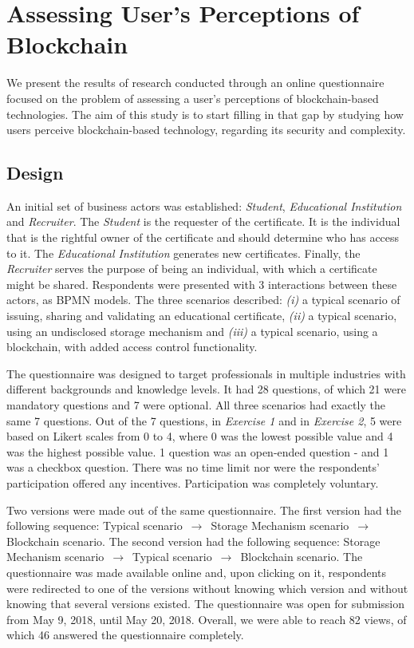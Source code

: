 \section{Assessing User's Perceptions of Blockchain}

We present the results of research conducted through an online questionnaire focused on the problem of assessing a user's perceptions of blockchain-based technologies. The aim of this study is to start filling in that gap by studying how users perceive blockchain-based technology, regarding its security and complexity.

\subsection{Design}

An initial set of business actors was established: \textit{Student}, \textit{Educational Institution} and \textit{Recruiter}. The \textit{Student} is the requester of the certificate. It is the individual that is the rightful owner of the certificate and should determine who has access to it. The \textit{Educational Institution} generates new certificates. Finally, the \textit{Recruiter} serves the purpose of being an individual, with which a certificate might be shared. Respondents were presented with 3 interactions between these actors, as BPMN \cite{BPMN} models. The three scenarios described: \emph{(i)} a typical scenario of issuing, sharing and validating an educational certificate, \emph{(ii)} a typical scenario, using an undisclosed storage mechanism and \emph{(iii)} a typical scenario, using a blockchain, with added access control functionality.

The questionnaire was designed to target professionals in multiple industries with different backgrounds and knowledge levels. It had 28 questions, of which 21 were mandatory questions and 7 were optional. All three scenarios had exactly the same 7 questions. Out of the 7 questions, in \textit{Exercise 1} and in \textit{Exercise 2}, 5 were based on Likert scales from 0 to 4, where 0 was the lowest possible value and 4 was the highest possible value. 1 question was an open-ended question - and 1 was a checkbox question. There was no time limit nor were the respondents' participation offered any incentives. Participation was completely voluntary. 

Two versions were made out of the same questionnaire. The first version had the following sequence: Typical scenario $\,\to\,$ Storage Mechanism scenario $\,\to\,$ Blockchain scenario. The second version had the following sequence: Storage Mechanism scenario $\,\to\,$ Typical scenario $\,\to\,$ Blockchain scenario. The questionnaire was made available online and, upon clicking on it, respondents were redirected to one of the versions without knowing which version and without knowing that several versions existed. The questionnaire was open for submission from May 9, 2018, until May 20, 2018. Overall, we were able to reach 82 views, of which 46 answered the questionnaire completely. 

